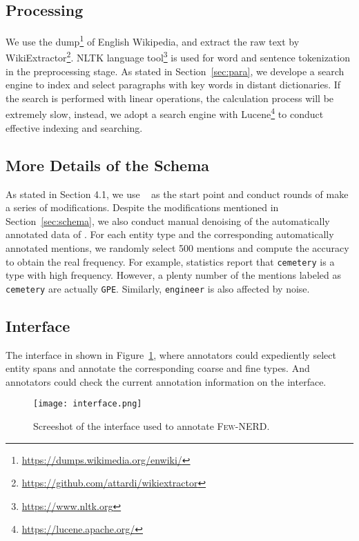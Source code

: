 \documentclass[11pt,a4paper, dvipsnames]{article}
\begin{document}
\subsection{Processing}
We use the dump\footnote{\url{https://dumps.wikimedia.org/enwiki/}} of English Wikipedia, and extract the raw text by WikiExtractor\footnote{\url{https://github.com/attardi/wikiextractor}}. NLTK language tool\footnote{\url{https://www.nltk.org}} is used for word and sentence tokenization in the preprocessing stage. As stated in Section~\ref{sec:para}, we develope a search engine to index and select paragraphs with key words in distant dictionaries. If the search is performed with linear operations, the calculation process will be extremely slow, instead, we adopt a search engine with Lucene\footnote{\url{https://lucene.apache.org/}} to conduct effective indexing and searching.

\subsection{More Details of the Schema}
As stated in Section 4.1,  we use ~\cite{ling2012fine} as the start point and conduct rounds of  make a series of modifications. Despite the modifications mentioned in Section~\ref{sec:schema}, we also conduct manual denoising of the automatically annotated data of . For each entity type and the corresponding automatically annotated mentions, we randomly select 500 mentions and compute the accuracy to obtain the real frequency. For example, statistics report that \texttt{cemetery} is a type with high frequency. However, a plenty number of the mentions labeled as \texttt{cemetery} are actually \texttt{GPE}. Similarly, \texttt{engineer} is also affected by noise.

\subsection{Interface}
The interface in shown in Figure~\ref{fig:inter}, where annotators could expediently select entity spans and annotate the corresponding coarse and fine types. And annotators could check the current annotation information on the interface.

\begin{figure}[h]
    \centering
    \texttt{[image: interface.png]}
    \caption{Screeshot of the interface used to annotate \textsc{Few-NERD}.}
    \label{fig:inter}
\end{figure}
\end{document}
